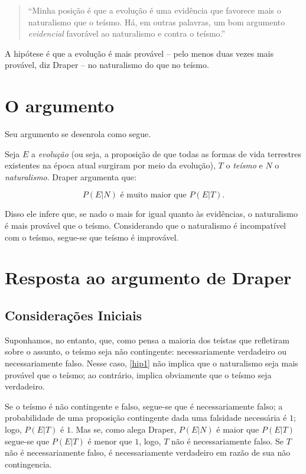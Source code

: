 \documentclass[11pt, a5paper]{exam}
\begin{document}
\begin{quote}
  ``Minha posição é que a evolução é uma evidência que favorece mais o naturalismo 
  que o teísmo.
  Há, em outras palavras, um bom argumento \textit{evidencial} favorável ao 
  naturalismo e contra o teísmo.'' 
\end{quote}

A hipótese é que a evolução é mais provável -- pelo menos duas vezes mais 
provável, diz Draper -- no naturalismo do que no teísmo.

\section{O argumento}

Seu argumento se desenrola como segue. 

Seja $ E $ a \textit{evolução} (ou seja, a proposição de que todas as formas de 
vida terrestres existentes na época atual surgiram por meio da evolução),  
$ T $ o \textit{teísmo} e $ N $ o \textit{naturalismo}. 
Draper argumenta que:

\begin{equation}\label{hip1}
  P(E | N) \text{ é muito maior que } P(E|T).
\end{equation}

Disso ele infere que, se nado o mais for igual quanto às evidências, o 
naturalismo é mais provável que o teísmo.
Considerando que o naturalismo é incompatível com o teísmo, segue-se que teísmo 
é improvável.

\section{Resposta ao argumento de Draper}

\subsection{Considerações Iniciais}

Suponhamos, no entanto, que, como pensa a maioria dos teístas que refletiram 
sobre o assunto, o teísmo seja não contingente: necessariamente verdadeiro ou 
necessariamente falso. 
Nesse caso, \eqref{hip1} não implica que o naturalismo seja mais provável que o 
teísmo; ao contrário, implica obviamente que o teísmo seja verdadeiro. 

Se o teísmo é não contingente e falso, segue-se que é necessariamente falso; a 
probabilidade de uma proposição contingente dada uma falsidade necessária é $ 1 $;
logo, $ P(E|T) $ é $ 1 $. 
Mas se, como alega Draper, $ P(E|N) $ é maior que $ P(E|T) $ segue-se que 
$ P(E|T) $ é menor que $ 1 $, logo, $ T $ não é necessariamente falso. 
Se $ T $ não é necessariamente falso, é necessariamente verdadeiro em razão de 
sua não contingencia. 
\end{document}
